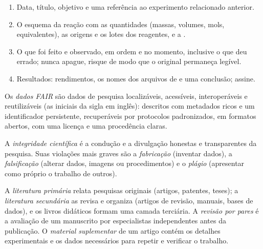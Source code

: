 \begin{method}\label{met:b3:lab-techniques-3:notebook}
\begin{enumerate}
  \item Data, título, objetivo e uma referência ao experimento relacionado anterior.
  \item O esquema da reação com as quantidades (massas, volumes, mols, equivalentes),
        as origens e os lotes dos reagentes, e a .
  \item O que foi feito e observado, em ordem e no momento, inclusive o que deu
        errado; nunca apague, risque de modo que o original permaneça legível.
  \item Resultados: rendimentos, os nomes dos arquivos de  e uma conclusão; assine.
\end{enumerate}
\end{method}

\begin{definition}\label{def:b3:lab-techniques-3:fair}
Os \emph{dados FAIR} são dados de pesquisa localizáveis,
acessíveis, interoperáveis e reutilizáveis (as iniciais da sigla em inglês): descritos com metadados ricos e um
identificador persistente, recuperáveis por protocolos padronizados, em formatos abertos, com
uma licença e uma procedência claras.
\end{definition}

\begin{definition}\label{def:b3:lab-techniques-3:integrity}
A \emph{integridade científica} é a condução e a divulgação
honestas e transparentes da pesquisa. Suas violações mais graves são a
\emph{fabricação} (inventar dados), a \emph{falsificação}
(alterar dados, imagens ou procedimentos) e o \emph{plágio}
(apresentar como próprio o trabalho de outros).
\end{definition}

\begin{definition}[A literatura]\label{def:b3:lab-techniques-3:literature}
A \emph{literatura primária} relata pesquisas
originais (artigos, patentes, teses); a \emph{literatura
secundária} as revisa e organiza (artigos de revisão,
manuais, bases de dados), e os livros didáticos formam uma camada terciária. A \emph{revisão
por pares} é a avaliação de um manuscrito por especialistas independentes
antes da publicação. O \emph{material suplementar}
de um artigo contém os detalhes experimentais e os dados necessários para
repetir e verificar o trabalho.
\end{definition}

